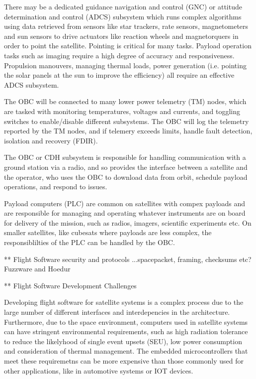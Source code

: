 \documentclass[../report.tex]{subfiles}
\begin{document}
There may be a dedicated guidance navigation and control (GNC) or attitude
determination and control (ADCS) subsystem which runs complex algorithms using
data retrieved from sensors like star trackers, rate sensors, magnetometers and
sun sensors to drive actuators like reaction wheels and magnetorquers in order
to point the satellite. Pointing is critical for many tasks. Payload operation
tasks such as imaging require a high degree of accuracy and responsiveness.
Propulsion manouvers, managing thermal loads, power generation (i.e. pointing
the solar panels at the sun to improve the efficiency) all require an effective
ADCS subsystem.

The OBC will be connected to many lower power telemetry (TM) nodes, which are
tasked with monitoring temperatures, voltages and currents, and toggling switches
to enable/disable different subsystems. The OBC will log the telemetry reported
by the TM nodes, and if telemery exceeds limits, handle fault detection,
isolation and recovery (FDIR).

The OBC or CDH subsystem is responsible for handling communication with a
ground station via a radio, and so provides the interface between a satellite
and the operator, who uses the OBC to download data from orbit, schedule
payload operations, and respond to issues.

Payload computers (PLC) are common on satellites with compex payloads and are
responsible for managing and operating whatever instruments are on board for
delivery of the mission, such as radios, imagers, scientific experiments etc.
On smaller satellites, like cubesats where payloads are less complex, the
responsiblilties of the PLC can be handled by the OBC.

** Flight Software security and protocols
...spacepacket, framing, checksums etc? Fuzzware and Hoedur

** Flight Software Development Challenges

Developing flight software for satellite systems is a complex process due to
the large number of different interfaces and interdepencies in the
architecture. Furthermore, due to the space environment, computers used in
satellite systems can have stringent environmental requirements, such as high
radiation tolerance to reduce the likelyhood of single event upsets (SEU), low
power consumption and consideration of thermal management. The embedded
microcontrollers that meet these requiremetns can be more expensive than those
commonly used for other applications, like in automotive systems or IOT devices.
\end{document}
